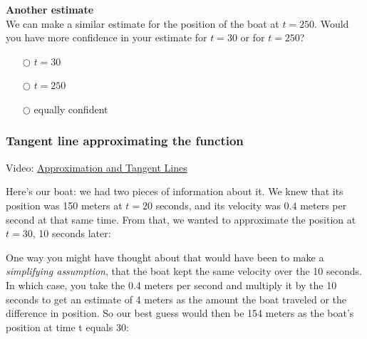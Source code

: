 \documentclass[pdftex, brazil, 12pt, twoside]{article}
\begin{document}
\begin{exercise}
  \textbf{Another estimate}\\%
  We can make a similar estimate for the position of the boat at $t=250$. Would
  you have more confidence in your estimate for $t=30$ or for $t=250$?
  \begin{itemize}[noitemsep]
  \item[$\bigcirc$] $t=30$
  \item[$\bigcirc$] $t=250$
  \item[$\bigcirc$] equally confident
  \end{itemize}
\end{exercise}

\subsubsection{Tangent line approximating the function}
\label{u2-linear-approximation-tangent-lines}

Video: \href{https://www.youtube.com/watch?v=Okh5l8fERPk}{Approximation and Tangent Lines}

Here's our boat: we had two pieces of information about it.
We knew that its position was 150 meters at $t= 20$ seconds, and its velocity
was $0.4$ meters per second at that same time.
From that, we wanted to approximate the position at $t= 30$, 10 seconds later:

\begin{figure}[H]
  \begin{center}
  \end{center}
\end{figure}

One way you might have thought about that
would have been to make a \emph{simplifying assumption},
that the boat kept the same velocity over the 10 seconds.
In which case, you take the 0.4 meters per second
and multiply it by the 10 seconds
to get an estimate of 4 meters as the amount the boat traveled
or the difference in position.
So our best guess would then be 154 meters
as the boat's position at time t equals 30:
\end{document}

